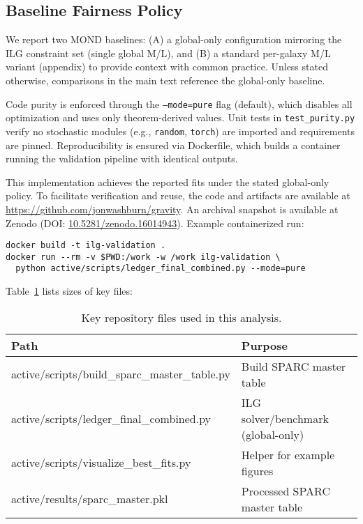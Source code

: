 \documentclass[usenatbib]{mnras}
\begin{document}
\subsection{Baseline Fairness Policy}
\noindent We report two MOND baselines: (A) a global-only configuration mirroring the ILG constraint set (single global M/L), and (B) a standard per-galaxy M/L variant (appendix) to provide context with common practice. Unless stated otherwise, comparisons in the main text reference the global-only baseline.

Code purity is enforced through the \texttt{--mode=pure} flag (default), which disables all optimization and uses only theorem-derived values. Unit tests in \texttt{test\_purity.py} verify no stochastic modules (e.g., \texttt{random}, \texttt{torch}) are imported and requirements are pinned. Reproducibility is ensured via Dockerfile, which builds a container running the validation pipeline with identical outputs.

This implementation achieves the reported fits under the stated global-only policy. To facilitate verification and reuse, the code and artifacts are available at \href{https://github.com/jonwashburn/gravity}{https://github.com/jonwashburn/gravity}. An archival snapshot is available at Zenodo (DOI: \href{https://doi.org/10.5281/zenodo.16014943}{10.5281/zenodo.16014943}). Example containerized run:

\begin{lstlisting}
docker build -t ilg-validation .
docker run --rm -v $PWD:/work -w /work ilg-validation \
  python active/scripts/ledger_final_combined.py --mode=pure
\end{lstlisting}
Table~\ref{tab:files} lists sizes of key files:

\begin{table}
\centering
\small
\setlength{\tabcolsep}{6pt}
\caption{Key repository files used in this analysis.}
\label{tab:files}
\begin{tabularx}{0.97\linewidth}{l >{\raggedright\arraybackslash}X}
\toprule
Path & Purpose \\
\midrule
active/scripts/build\_sparc\_master\_table.py & Build SPARC master table \\
active/scripts/ledger\_final\_combined.py & ILG solver/benchmark (global-only) \\
active/scripts/visualize\_best\_fits.py & Helper for example figures \\
active/results/sparc\_master.pkl & Processed SPARC master table \\
\bottomrule
\end{tabularx}
\end{table}
\end{document}
